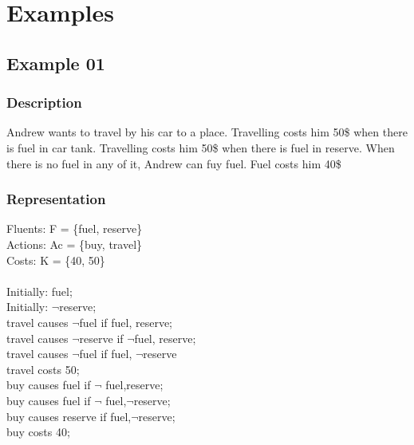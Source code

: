 \documentclass[11pt]{article}
\begin{document}
	\section{Examples}\label{sec:Examples}
	\subsection{Example 01}\label{example:ex01}
	\subsubsection{Description}\label{par:p101}
	Andrew wants to travel by his car to a place. Travelling costs him 50\$ when there is fuel in car tank. Travelling costs him 50\$ when there is fuel in reserve. When there is no fuel in any of it, Andrew can fuy fuel. Fuel costs him 40\$
	\subsubsection{Representation}\label{par:p201}
	Fluents: F = \{fuel, reserve\}\\
	Actions: Ac = \{buy, travel\}\\
	Costs: K = \{40, 50\}\\
	\\
	Initially:  fuel; \\
	Initially: $\neg$reserve; \\
	travel causes $\neg$fuel if fuel, reserve; \\
	travel causes $\neg$reserve if $\neg$fuel, reserve;\\
	travel causes $\neg$fuel if fuel, $\neg$reserve\\
	travel costs 50; \\
	buy causes fuel if $\neg$ fuel,reserve;\\
	buy causes fuel if $\neg$ fuel,$\neg$reserve;\\
	buy causes reserve if  fuel,$\neg$reserve;\\
	buy costs 40; \\
\end{document}
